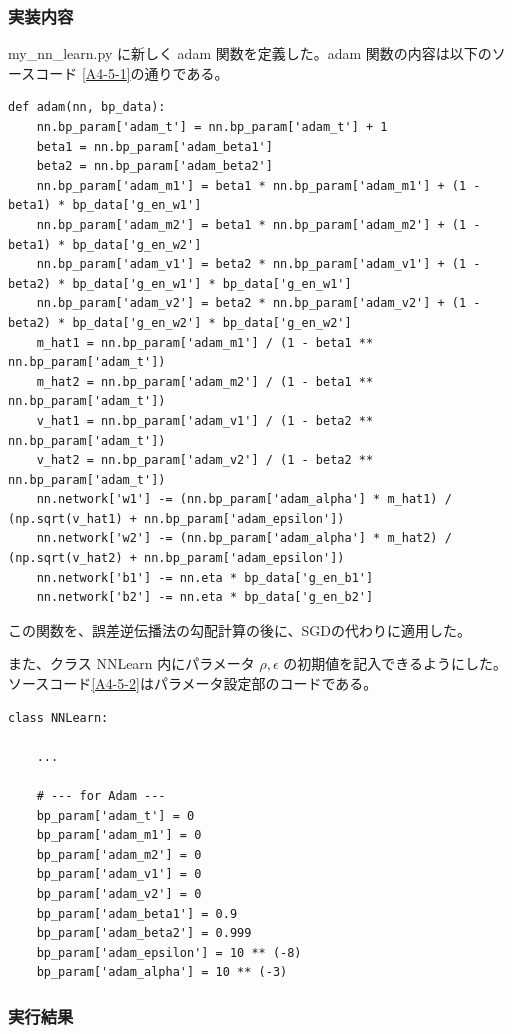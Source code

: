 \documentclass[a4paper,dvipdfmx]{jsarticle}
\begin{document}
\subsubsection*{実装内容}
my\_nn\_learn.py に新しく adam 関数を定義した。adam 関数の内容は以下のソースコード \ref{A4-5-1}の通りである。
\begin{lstlisting}[caption="Adam",label=A4-5-1]
def adam(nn, bp_data):
    nn.bp_param['adam_t'] = nn.bp_param['adam_t'] + 1
    beta1 = nn.bp_param['adam_beta1']
    beta2 = nn.bp_param['adam_beta2']
    nn.bp_param['adam_m1'] = beta1 * nn.bp_param['adam_m1'] + (1 - beta1) * bp_data['g_en_w1']
    nn.bp_param['adam_m2'] = beta1 * nn.bp_param['adam_m2'] + (1 - beta1) * bp_data['g_en_w2']
    nn.bp_param['adam_v1'] = beta2 * nn.bp_param['adam_v1'] + (1 - beta2) * bp_data['g_en_w1'] * bp_data['g_en_w1']
    nn.bp_param['adam_v2'] = beta2 * nn.bp_param['adam_v2'] + (1 - beta2) * bp_data['g_en_w2'] * bp_data['g_en_w2']
    m_hat1 = nn.bp_param['adam_m1'] / (1 - beta1 ** nn.bp_param['adam_t'])
    m_hat2 = nn.bp_param['adam_m2'] / (1 - beta1 ** nn.bp_param['adam_t'])
    v_hat1 = nn.bp_param['adam_v1'] / (1 - beta2 ** nn.bp_param['adam_t'])
    v_hat2 = nn.bp_param['adam_v2'] / (1 - beta2 ** nn.bp_param['adam_t'])
    nn.network['w1'] -= (nn.bp_param['adam_alpha'] * m_hat1) / (np.sqrt(v_hat1) + nn.bp_param['adam_epsilon'])
    nn.network['w2'] -= (nn.bp_param['adam_alpha'] * m_hat2) / (np.sqrt(v_hat2) + nn.bp_param['adam_epsilon'])
    nn.network['b1'] -= nn.eta * bp_data['g_en_b1']
    nn.network['b2'] -= nn.eta * bp_data['g_en_b2']
\end{lstlisting}

この関数を、誤差逆伝播法の勾配計算の後に、SGDの代わりに適用した。

また、クラス NNLearn 内にパラメータ $\rho, \epsilon$ の初期値を記入できるようにした。ソースコード\ref{A4-5-2}はパラメータ設定部のコードである。
\begin{lstlisting}[caption="Adam のパラメータ設定部",label=A4-5-2]
class NNLearn:

	...
	
    # --- for Adam ---
    bp_param['adam_t'] = 0
    bp_param['adam_m1'] = 0
    bp_param['adam_m2'] = 0
    bp_param['adam_v1'] = 0
    bp_param['adam_v2'] = 0
    bp_param['adam_beta1'] = 0.9
    bp_param['adam_beta2'] = 0.999
    bp_param['adam_epsilon'] = 10 ** (-8)
    bp_param['adam_alpha'] = 10 ** (-3)
\end{lstlisting}

\subsubsection*{実行結果}
\end{document}
